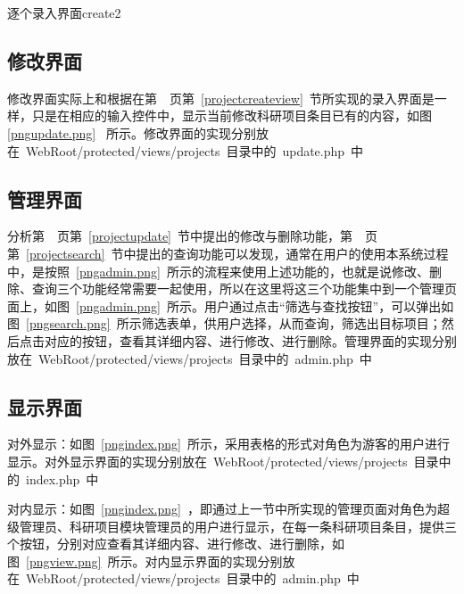 \begin{pics}[htbp]{逐个录入界面}{create2}
\end{pics}

\subsection{修改界面}

修改界面实际上和根据在第~\pageref{projectcreateview}~页第~\ref{projectcreateview}~节所实现的录入界面是一样，只是在相应的输入控件中，显示当前修改科研项目条目已有的内容，如图\ref{pngupdate.png}~
所示。修改界面的实现分别放在~WebRoot/protected/views/projects~目录中的~update.php~中


\subsection{管理界面}
分析第~\pageref{projectupdate}~页第~\ref{projectupdate}~节中提出的修改与删除功能，第~\pageref{projectsearch}~页第~\ref{projectsearch}~节中提出的查询功能可以发现，通常在用户的使用本系统过程中，是按照~\ref{pngadmin.png}~所示的流程来使用上述功能的，也就是说修改、删除、查询三个功能经常需要一起使用，所以在这里将这三个功能集中到一个管理页面上，如图~\ref{pngadmin.png}~所示。用户通过点击“筛选与查找按钮”，可以弹出如图~\ref{pngsearch.png}~所示筛选表单，供用户选择，从而查询，筛选出目标项目；然后点击对应的按钮，查看其详细内容、进行修改、进行删除。管理界面的实现分别放在~WebRoot/protected/views/projects~目录中的~admin.php~中



\subsection{显示界面}

对外显示：如图~\ref{pngindex.png}~所示，采用表格的形式对角色为游客的用户进行显示。对外显示界面的实现分别放在~WebRoot/protected/views/projects~目录中的~index.php~中


对内显示：如图~\ref{pngindex.png}~，即通过上一节中所实现的管理页面对角色为超级管理员、科研项目模块管理员的用户进行显示，在每一条科研项目条目，提供三个按钮，分别对应查看其详细内容、进行修改、进行删除，如图~\ref{pngview.png}~所示。对内显示界面的实现分别放在~WebRoot/protected/views/projects~目录中的~admin.php~中



